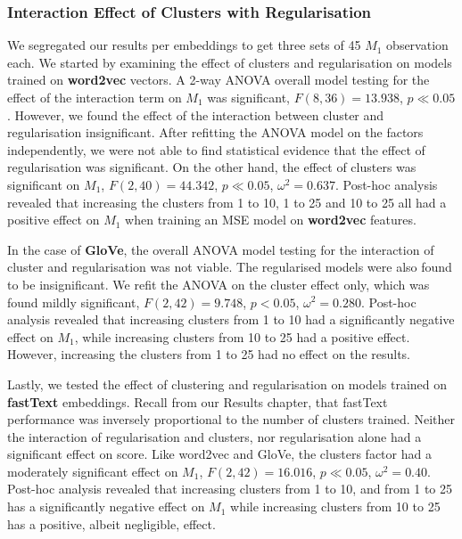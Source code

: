 \subsubsection{Interaction Effect of Clusters with Regularisation}
We segregated our results per embeddings to get three sets of 45 $M_1$ observation each.  We started by examining the effect of clusters and regularisation on models trained on \textbf{word2vec} vectors.  A 2-way \ac{ANOVA} overall model testing for the effect of the interaction term on $M_1$ was significant, $F(8,36)=13.938$, $p \ll 0.05$.  However, we found the effect of the interaction between cluster and regularisation  insignificant.  After refitting the ANOVA model on the factors independently, we were not able to find statistical evidence that the effect of regularisation was significant.  On the other hand, the effect of clusters was significant on $M_1$, $F(2,40)=44.342$, $p \ll 0.05$, $\omega^2=0.637$.  Post-hoc analysis revealed that increasing the clusters from 1 to 10, 1 to 25 and 10 to 25 all had a positive effect on $M_1$ when training an MSE model on \textbf{word2vec} features.

In the case of \textbf{GloVe}, the overall \ac{ANOVA} model testing for the interaction of cluster and regularisation was not viable.  The regularised models were also found to be insignificant.  We refit the \ac{ANOVA} on the cluster effect only, which was found mildly significant, $F(2,42)=9.748$, $p < 0.05$, $\omega^2 = 0.280$.  Post-hoc analysis revealed that increasing clusters from 1 to 10 had a significantly negative effect on $M_1$, while increasing clusters from 10 to 25 had a positive effect.  However, increasing the clusters from 1 to 25 had no effect on the results.

Lastly, we tested the effect of clustering and regularisation on models trained on \textbf{fastText} embeddings.  Recall from our Results chapter, that fastText performance was inversely proportional to the number of clusters trained.  Neither the interaction of regularisation and clusters, nor regularisation alone had a significant effect on score.  Like word2vec and GloVe, the clusters factor had a moderately significant effect on $M_1$,  $F(2,42)=16.016$, $p \ll 0.05$, $\omega^2=0.40$.  Post-hoc analysis revealed that increasing clusters from 1 to 10, and from 1 to 25 has a significantly negative effect on $M_1$ while increasing clusters from 10 to 25 has a positive, albeit negligible, effect.  

